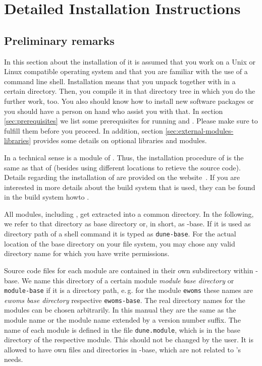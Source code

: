 \chapter{Detailed Installation Instructions}
\label{install}

\section{Preliminary remarks}

In this section about the installation of \eWoms it is assumed that
you work on a Unix or Linux compatible operating system and that you
are familiar with the use of a command line shell. Installation means
that you unpack \Dune together with \eWoms in a certain directory.
Then, you compile it in that directory tree in which you do the
further work, too. You also should know how to install new software
packages or you should have a person on hand who assist you with
that. In section \ref{sec:prerequisites} we list some prerequisites
for running \Dune and \eWoms.  Please make sure to fulfill them before
you proceed. In addition, section \ref{sec:external-modules-libraries}
provides some details on optional libraries and modules.

In a technical sense \eWoms is a module of \Dune.  Thus, the
installation procedure of \eWoms is the same as that of \Dune (besides
using different locations to retieve the source code).  Details
regarding the installation of \Dune are provided on the \Dune
website~\cite{DUNE-INST}. If you are interested in more details about
the build system that is used, they can be found in the {\Dune}
build system howto \cite{DUNE-BS}.

All \Dune modules, including \eWoms, get extracted into a common
directory. In the following, we refer to that directory as {\Dune}
base directory or, in short, as {\Dune}-base.  If it is used as
directory path of a shell command it is typed as
\texttt{dune-base}.  For the actual location of the {\Dune} base
directory on your file system, you may chose any valid directory name for
which you have write permissions.

Source code files for each \Dune module are contained in their own
subdirectory within {\Dune}-base.  We name this directory of a certain
module \emph{module base directory} or \texttt{module-base}
if it is a directory path, e.\,g. for the module \texttt{ewoms} these
names are \emph{ewoms base directory} respective
\texttt{ewoms-base}.  The real directory names for the
modules can be chosen arbitrarily. In this manual they are the same as
the module name or the module name extended by a version number
suffix.  The name of each \Dune module is defined in the file
\texttt{dune.module}, which is in the base directory of the respective
module. This should not be changed by the user.  It is allowed to have
own files and directories in \Dune-base, which are not related to
\Dune's needs.

